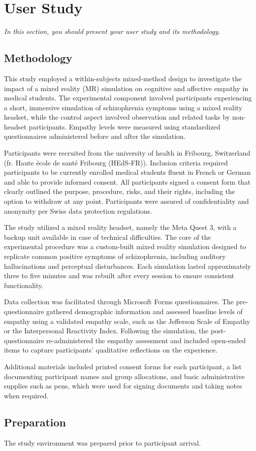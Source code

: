 \chapter{User Study}
\label{ch:userstudy}

\emph{In this section, you should present your user study and its methodology. }

\section{Methodology}

This study employed a within-subjects mixed-method design to investigate the impact of a mixed reality (MR) simulation on cognitive and affective empathy in medical students. The experimental component involved participants experiencing a short, immersive simulation of schizophrenia symptoms using a mixed reality headset, while the control aspect involved observation and related tasks by non-headset participants. Empathy levels were measured using standardized questionnaires administered before and after the simulation.

Participants were recruited from the university of health in Fribourg, Switzerland (fr. Haute école de santé Fribourg (HEdS-FR)). Inclusion criteria required participants to be currently enrolled medical students fluent in French or German and able to provide informed consent. All participants signed a consent form that clearly outlined the purpose, procedure, risks, and their rights, including the option to withdraw at any point. Participants were assured of confidentiality and anonymity per Swiss data protection regulations.

The study utilized a mixed reality headset, namely the Meta Quest 3, with a backup unit available in case of technical difficulties. The core of the experimental procedure was a custom-built mixed reality simulation designed to replicate common positive symptoms of schizophrenia, including auditory hallucinations and perceptual disturbances. Each simulation lasted approximately three to five minutes and was rebuilt after every session to ensure consistent functionality.

Data collection was facilitated through Microsoft Forms questionnaires. The pre-questionnaire gathered demographic information and assessed baseline levels of empathy using a validated empathy scale, such as the Jefferson Scale of Empathy or the Interpersonal Reactivity Index. Following the simulation, the post-questionnaire re-administered the empathy assessment and included open-ended items to capture participants’ qualitative reflections on the experience.

Additional materials included printed consent forms for each participant, a list documenting participant names and group allocations, and basic administrative supplies such as pens, which were used for signing documents and taking notes when required.

\section{Preparation}

The study environment was prepared prior to participant arrival. 